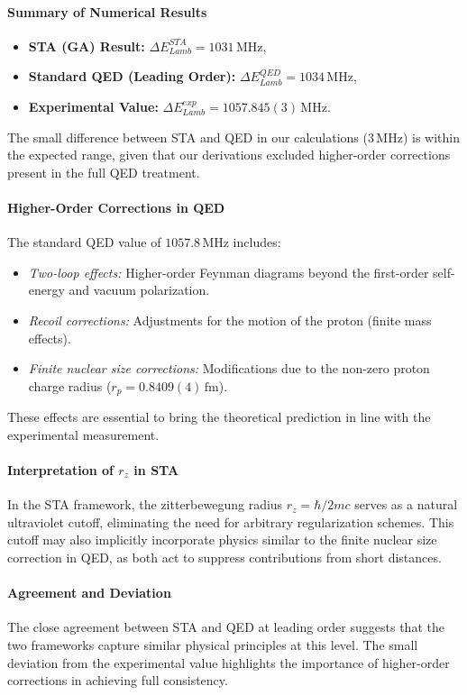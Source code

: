 \documentclass[12pt]{article}
\begin{document}
\paragraph{Summary of Numerical Results}
\begin{itemize}
    \item \textbf{STA (GA) Result:} \(\Delta E_{Lamb}^{STA}=1031\,\mathrm{MHz}\),
    \item \textbf{Standard QED (Leading Order):} \(\Delta E_{Lamb}^{QED}=1034\,\mathrm{MHz}\),
    \item \textbf{Experimental Value:} \(\Delta E_{Lamb}^{exp}=1057.845(3)\,\mathrm{MHz}\).
\end{itemize}

The small difference between STA and QED in our calculations (\(3\,\mathrm{MHz}\)) is within the expected range, given that our derivations excluded higher-order corrections present in the full QED treatment.

\paragraph{Higher-Order Corrections in QED}
The standard QED value of \(1057.8\,\mathrm{MHz}\) includes:
\begin{itemize}
    \item \emph{Two-loop effects:} Higher-order Feynman diagrams beyond the first-order self-energy and vacuum polarization.
    \item \emph{Recoil corrections:} Adjustments for the motion of the proton (finite mass effects).
    \item \emph{Finite nuclear size corrections:} Modifications due to the non-zero proton charge radius (\(r_p = 0.8409(4)\,\mathrm{fm}\)).
\end{itemize}
These effects are essential to bring the theoretical prediction in line with the experimental measurement.

\paragraph{Interpretation of \(r_z\) in STA}
In the STA framework, the zitterbewegung radius \(r_z=\hbar/2mc\) serves as a natural ultraviolet cutoff, eliminating the need for arbitrary regularization schemes. This cutoff may also implicitly incorporate physics similar to the finite nuclear size correction in QED, as both act to suppress contributions from short distances.

\paragraph{Agreement and Deviation}
The close agreement between STA and QED at leading order suggests that the two frameworks capture similar physical principles at this level. The small deviation from the experimental value highlights the importance of higher-order corrections in achieving full consistency.
\end{document}
